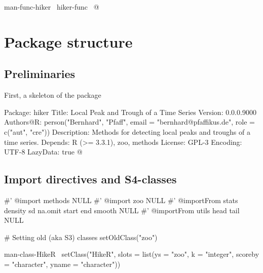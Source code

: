 \documentclass[a4paper]{article}
\begin{document}
\nwenddocs{}\endmoddef\let\nwnotused=\nwoutput{}
\LA{}man-func-hiker~{\nwtagstyle{}}\RA{}
\LA{}hiker-func~{\nwtagstyle{}}\RA{}
\nwnotused{hiker.R}\nwendcode{}@

\section{Package structure}


\subsection{Preliminaries}

First, a skeleton of the package

\nwenddocs{}\endmoddef\let\nwnotused=\nwoutput{}
Package: hiker
Title: Local Peak and Trough of a Time Series
Version: 0.0.0.9000
Authors@R: person("Bernhard", "Pfaff", email = "bernhard@pfaffikus.de",
                  role = c("aut", "cre"))
Description: Methods for detecting local peaks and troughs of a time series.
Depends: R (>= 3.3.1), zoo, methods
License: GPL-3
Encoding: UTF-8
LazyData: true
\nwnotused{DESCRIPTION.R}\nwendcode{}@



\subsection{Import directives and S4-classes}

\nwenddocs{}\endmoddef\let\nwnotused=\nwoutput{}
#' @import methods
NULL
#' @import zoo
NULL
#' @importFrom stats density sd na.omit start end smooth
NULL
#' @importFrom utils head tail
NULL

# Setting old (aka S3) classes
setOldClass("zoo")


\LA{}man-class-HikeR~{\nwtagstyle{}}\RA{}
setClass("HikeR", slots = list(ys = "zoo",
                               k = "integer",
                               scoreby = "character",
                               yname = "character"))
\end{document}
